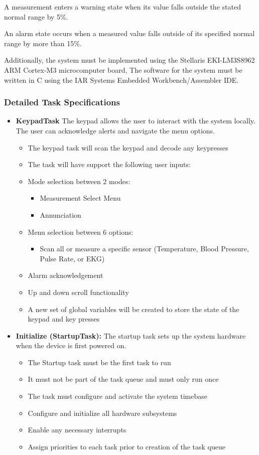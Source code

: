 \documentclass[12pt]{article} %
\begin{document}
A measurement enters a warning state when its value falls outside the stated 
normal range by 5\%. 

An alarm state occurs when a measured value falls outside of its specified
normal range by more than 15\%.

Additionally, the system must be implemented using the Stellaris 
EKI-LM3S8962 ARM Cortex-M3 microcomputer board, The software for the system 
must be written in C using the IAR Systems Embedded Workbench/Assembler IDE.

\subsubsection{Detailed Task Specifications}

\begin{itemize}
	\item \textbf{KeypadTask}
		The keypad allows the user to interact with the system locally. The user
		can acknowledge alerts and navigate the menu options.
    \begin{itemize}
      \item The keypad task will scan the keypad and decode any keypresses
      \item The task will have support the following user inputs:
      \item Mode selection between 2 modes:
				\begin{itemize}
					\item Measurement Select Menu
					\item Annunciation
				\end{itemize}
      \item Menu selection between 6 options:
				\begin{itemize}
					\item Scan all or measure a specific sensor (Temperature, Blood
						Pressure, Pulse Rate, or EKG)
				\end{itemize}
      \item Alarm acknowledgement
      \item Up and down scroll functionality 
      \item A new set of global variables will be created to store the state of the keypad and key presses
    \end{itemize}

	\item \textbf{Initialize (StartupTask):}
		The startup task sets up the system hardware when the device is first powered on.
    \begin{itemize}
			\item The Startup task must be the first task to run
			\item It must not be part of the task queue and must only run once
			\item The task must configure and activate the system timebase
			\item Configure and initialize all hardware subsystems
			\item Enable any necessary interrupts
			\item Assign priorities to each task prior to creation of the task queue
    \end{itemize}


\end{itemize}
\end{document}
